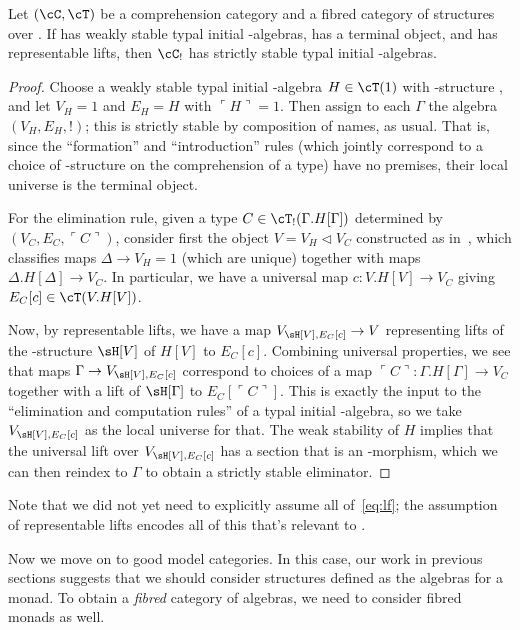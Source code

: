 \documentclass[referee]{psp}
\def\name#1{\ulcorner #1\urcorner}
\let\S\cS
\let\C\cC
\let\T\cT
\begin{document}
\begin{lem}
  Let $(\C,\T)$ be a comprehension category and \S a fibred category of structures over \C.
  If \C has weakly stable typal initial \S-algebras, \C has a terminal object, and \S has representable lifts, then $\C_!$ has strictly stable typal initial \S-algebras.
\end{lem}
\begin{proof}
  Choose a weakly stable typal initial \S-algebra $H\in\T(1)$ with \S-structure \sH, and let $V_H = 1$ and $E_H = H$ with $\name{H}= 1$.
  Then assign to each $\Gamma$ the algebra $(V_H,E_H,!)$; this is strictly stable by composition of names, as usual.
  That is, since the ``formation'' and ``introduction'' rules (which jointly correspond to a choice of \S-structure on the comprehension of a type) have no premises, their local universe is the terminal object.

  For the elimination rule, given a type $C\in \T_!(\Gamma.H[\Gamma])$ determined by $(V_C,E_C,\name{C})$, consider first the object $V = V_H\triangleleft V_C$ constructed as in~\cite{lw:localuniv}, which classifies maps $\Delta \to V_H = 1$ (which are unique) together with maps $\Delta.H[\Delta] \to V_C$.
  In particular, we have a universal map $c:V.H[V]\to V_C$ giving $E_C[c]\in \T(V.H[V])$.

  Now, by representable lifts, we have a map $V_{\sH[V],E_C[c]} \to V$ representing lifts of the \S-structure $\sH[V]$ of $H[V]$ to $E_C[c]$.
  Combining universal properties, we see that maps $\Gamma\to V_{\sH[V],E_C[c]}$ correspond to choices of a map $\name{C}:\Gamma.H[\Gamma]\to V_C$ together with a lift of $\sH[\Gamma]$ to $E_C[\name{C}]$.
  This is exactly the input to the ``elimination and computation rules'' of a typal initial \S-algebra, so we take $V_{\sH[V],E_C[c]}$ as the local universe for that.
  The weak stability of $H$ implies that the universal lift over $V_{\sH[V],E_C[c]}$ has a section that is an \S-morphism, which we can then reindex to $\Gamma$ to obtain a strictly stable eliminator.
\end{proof}

Note that we did not yet need to explicitly assume all of~\eqref{eq:lf}; the assumption of representable lifts encodes all of this that's relevant to \S.

Now we move on to good model categories.
In this case, our work in previous sections suggests that we should consider structures defined as the algebras for a monad.
To obtain a \emph{fibred} category of algebras, we need to consider fibred monads as well.
\end{document}
